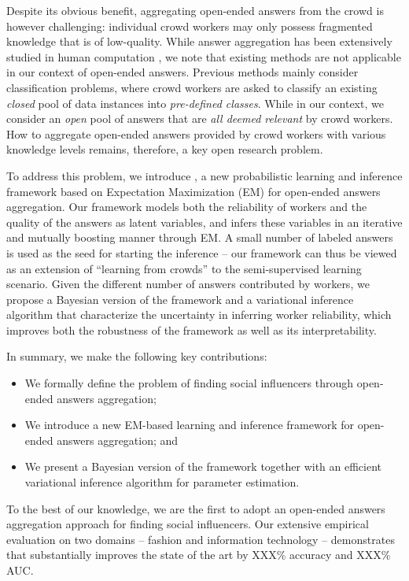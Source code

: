 Despite its obvious benefit, aggregating open-ended answers from the crowd is however challenging: individual crowd workers may only possess fragmented knowledge that is of low-quality. While answer aggregation has been extensively studied in human computation \cite{dawid1979maximum,whitehill2009whose,ZhengLLSC17}, we note that existing methods are not applicable in our context of open-ended answers. Previous methods mainly consider classification problems, where crowd workers are asked to classify an existing \emph{closed} pool of data instances into \emph{pre-defined classes}. While in our context, we consider an \emph{open} pool of answers that are \emph{all deemed relevant} by crowd workers. How to aggregate open-ended answers provided by crowd workers with various knowledge levels remains, therefore, a key open research problem.

To address this problem, we introduce \sys, a new probabilistic learning and inference framework based on Expectation Maximization (EM) for open-ended answers aggregation. Our framework models both the reliability of workers and the quality of the answers as latent variables, and infers these variables in an iterative and mutually boosting manner through EM. A small number of labeled answers is used as the seed for starting the inference -- our framework can thus be viewed as an extension of ``learning from crowds''  \cite{raykar2010learning,tian2012learning,yang2018leveraging} to the semi-supervised learning scenario. Given the different number of answers contributed by workers, we propose a Bayesian version of the framework and a variational inference algorithm that characterize the uncertainty in inferring worker reliability, which improves both the robustness of the framework as well as its interpretability. 

In summary, we make the following key contributions:
\begin{itemize}
\item We formally define the problem of finding social influencers through open-ended answers aggregation;
\item We introduce a new EM-based learning and inference framework for open-ended answers aggregation; and
\item We present a Bayesian version of the framework together with an efficient variational inference algorithm for parameter estimation. 
\end{itemize}

To the best of our knowledge, we are the first to adopt an open-ended answers aggregation approach for finding social influencers. Our extensive empirical evaluation on two domains -- fashion and information technology -- demonstrates that \sys substantially improves the state of the art by  XXX\% accuracy and XXX\% AUC. 